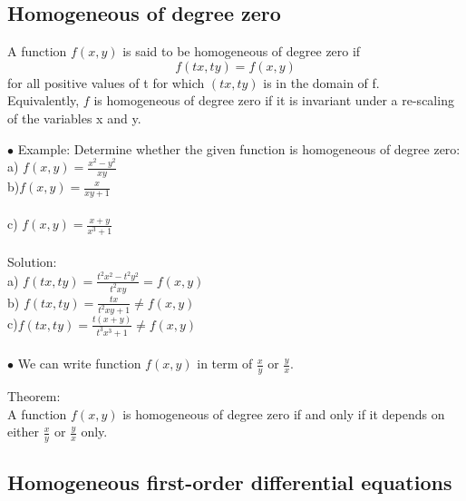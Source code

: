 \documentclass[12pt]{article}
\begin{document}
\subsection{Homogeneous of degree zero}
\begin{mybox}
    A function $f(x, y)$ is said to be homogeneous of degree zero if
    $$f(tx,ty) = f(x,y)$$
    for all positive values of t for which $(tx, ty)$ is in the domain of f.\\
    Equivalently, $f$ is homogeneous of degree zero if it is invariant under a re-scaling of the variables x and y.

\end{mybox}
$\bullet$ Example: Determine whether the given function is homogeneous of degree zero: \\
a) $\displaystyle f(x,y) = \frac{x^2-y^2}{xy}$
\\
b)$\displaystyle f(x,y) = \frac{x}{xy+1}$\\
\\
c) $\displaystyle f(x,y) = \frac{x+y}{x^3 +1}$\\
\\
Solution: \\
a) $\displaystyle f(tx,ty) = \frac{t^2x^2-t^2y^2}{t^2xy} = f(x,y)$ \\
b) $\displaystyle f(tx,ty) = \frac{tx}{t^2xy+1} \neq f(x,y)$\\
c)$\displaystyle f(tx,ty) = \frac{t(x+y)}{t^3x^3+1} \neq f(x,y)$
\\
\\
$\bullet$ We can write function $f(x,y)$ in term of $\frac{x}{y}$ or $\frac{y}{x}$. 
\begin{mybox}
    Theorem: \\
    A function $f(x, y)$ is homogeneous of degree zero if and only if it
depends on either $\frac{x}{y}$ or $\frac{y}{x}$ only. 
\end{mybox}

\subsection{Homogeneous first-order differential equations}
\end{document}
